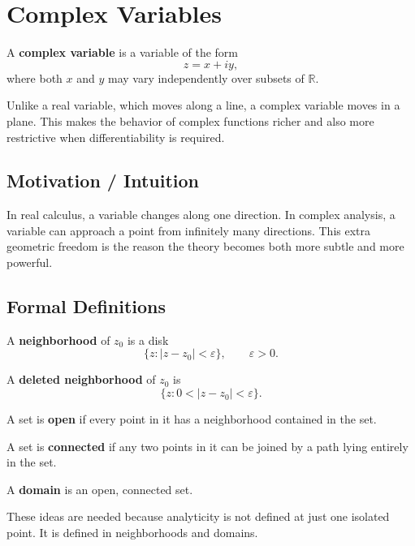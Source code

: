 
\section{Complex Variables}

\begin{conceptbox}
    A \textbf{complex variable} is a variable of the form
    \[
        z=x+iy,
    \]
    where both $x$ and $y$ may vary independently over subsets of $\mathbb{R}$.
\end{conceptbox}

Unlike a real variable, which moves along a line, a complex variable moves in a plane. This makes the behavior of complex functions richer and also more restrictive when differentiability is required.

\subsection*{Motivation / Intuition}

In real calculus, a variable changes along one direction. In complex analysis, a variable can approach a point from infinitely many directions. This extra geometric freedom is the reason the theory becomes both more subtle and more powerful.

\subsection*{Formal Definitions}

\begin{conceptbox}
    A \textbf{neighborhood} of $z_0$ is a disk
    \[
        \{z: |z-z_0|<\varepsilon\}, \qquad \varepsilon>0.
    \]

    A \textbf{deleted neighborhood} of $z_0$ is
    \[
        \{z: 0<|z-z_0|<\varepsilon\}.
    \]

    A set is \textbf{open} if every point in it has a neighborhood contained in the set.

    A set is \textbf{connected} if any two points in it can be joined by a path lying entirely in the set.

    A \textbf{domain} is an open, connected set.
\end{conceptbox}

These ideas are needed because analyticity is not defined at just one isolated point. It is defined in neighborhoods and domains.

